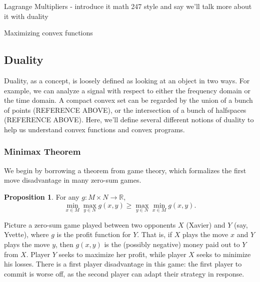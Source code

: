 \documentclass[11pt]{article}
\numberwithin{equation}{section}
\theoremstyle{definition}
\newtheorem{proposition}[theorem]{Proposition}
\newcommand{\bR}{\mathbb{R}}
\begin{document}
Lagrange Multipliers - introduce it math 247 style and say we'll talk more about it with duality

Maximizing convex functions
\subsection{Duality}
Duality, as a concept, is loosely defined as looking at an object in two ways. For example, we can analyze a signal with respect to either the frequency domain or the time domain. A compact convex set can be regarded by the union of a bunch of points (REFERENCE ABOVE), or the intersection of a bunch of halfspaces (REFERENCE ABOVE). Here, we'll define several different notions of duality to help us understand convex functions and convex programs.
\subsubsection{Minimax Theorem}
We begin by borrowing a theorem from game theory, which formalizes the first move disadvantage in many zero-sum games.
\begin{proposition}
    \label{prpweakduality}
    For any $g:M\times N\to\bR$,
    \begin{equation}
    \label{prpweakdualityeq}
        \min_{x\in M}\max_{y\in N} g(x,y)\ge \max_{y\in N}\min_{x\in M} g(x,y).
    \end{equation}
\end{proposition}
Picture a zero-sum game played between two opponents $X$ (Xavier) and $Y$ (say, Yvette), where $g$ is the profit function for $Y$. That is, if $X$ plays the move $x$ and $Y$ plays the move $y$, then $g(x,y)$ is the (possibly negative) money paid out to $Y$ from $X$. Player $Y$ seeks to maximize her profit, while player $X$ seeks to minimize his losses. There is a first player disadvantage in this game: the first player to commit is worse off, as the second player can adapt their strategy in response.
\end{document}
